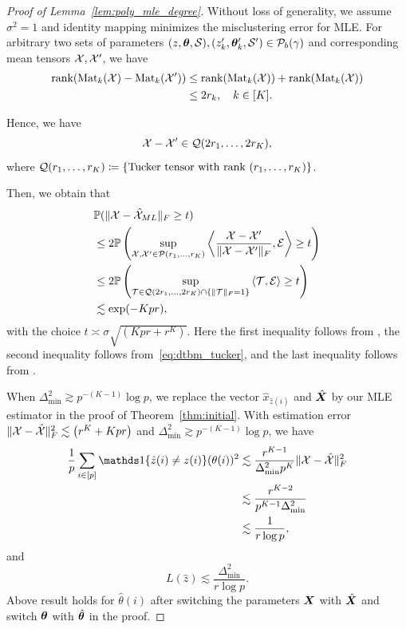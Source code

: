 \documentclass[journal]{IEEEtran}
\theoremstyle{definition}
\theoremstyle{definition}
\newcommand{\of}[1]{\left(#1\right)}
\newcommand{\ang}[1]{\left\langle#1\right\rangle}
\begin{document}
\begin{proof}[Proof of Lemma~\ref{lem:poly_mle_degree}] Without loss of generality, we assume $\sigma^2 = 1$ and identity mapping minimizes the misclustering error for MLE.
For arbitrary two sets of parameters $(z, \boldsymbol{\theta}, \mathcal{S}), (z_k', \boldsymbol{\theta}_k', \mathcal{S}') \in \mathcal{P}_b(\gamma)$ and corresponding mean tensors $\mathcal{X}, \mathcal{X}'$, we have 
\begin{align}
    \text{rank}(\text{Mat}_k(\mathcal{X}) - \text{Mat}_k(\mathcal{X}')) &\leq \text{rank}(\text{Mat}_k(\mathcal{X})) + \text{rank}(\text{Mat}_k(\mathcal{X})) \\
    &\leq 2 r_k, \quad k \in [K].
\end{align}

Hence, we have
\begin{equation}\label{eq:dtbm_tucker}
    \tX - \tX' \in \tQ(2r_1, \ldots, 2 r_K),
\end{equation}
where $\mathcal{Q}(r_1, \ldots, r_K) \coloneqq \{ \text{Tucker tensor with rank }(r_1, \ldots,  r_K) \} $.

Then, we obtain that 
\begin{align}
     & \bbP(\FnormSize{}{\tX - \hat \tX_{ML}} \geq t) \\
     &\leq 2  \bbP\of{ \sup_{ \tX, \tX' \in \tP(r_1, 
\ldots, r_K)} \ang{ \frac{\tX - \tX'}{\FnormSize{}{\tX - \tX'}}, \tE  } \geq t } \\
     &\leq 2  \bbP\of{ \sup_{ \tT \in \tQ(2r_1, \ldots, 2r_K) \cap \{ \onormSize{}{\tT}_F = 1\} } \ang{ \tT, \tE  } \geq t } \\
     &\lesssim  \exp(-Kpr),
\end{align}
with the choice $t\asymp \sigma \sqrt{(Kpr + r^K)}$. Here the first inequality follows from \cite[Lemma 1]{wang2019multiway}, the second inequality follows from~\eqref{eq:dtbm_tucker}, and the last inequality follows from \cite[Lemma E5]{han2022optimal}.


When $\Delta_{\min}^2 \gtrsim p^{-(K-1)} \log p$, we replace the vector $\hat x_{\hat z(i)}$ and $\hat {\bm X}$ by our MLE estimator in the proof of Theorem~\ref{thm:initial}. With estimation error $\onormSize{}{\tX - \hat \tX}_F^2 \lesssim \of{ r^{K} + K p r}$ and $\Delta_{\min}^2 \gtrsim p^{-(K-1)} \log p$, we have 
\begin{align}
      \frac{1}{p} \sum_{i \in [p]} \ind\{ \hat z(i) \neq z(i) \} (\theta(i))^2 &\lesssim \frac{r^{K-1}}{\Delta_{\min}^2 p^{K}} \onormSize{}{\tX - \hat \tX}_F^2 \\
      &\lesssim \frac{r^{K-2}}{p^{K-1} \Delta_{\min}^2} \\
      & \lesssim \frac{1}{r \log p},
\end{align}
and 
\begin{equation}
     L(\hat z) \lesssim \frac{\Delta_{\min}^2}{r \log p}.
\end{equation}
Above result holds for $\hat \theta(i)$ after switching the parameters $\bm X$ with $\hat {\bm X}$ and switch $\boldsymbol{\theta}$ with $\hat {\boldsymbol{\theta}}$ in the proof. 



\end{proof}
\end{document}
